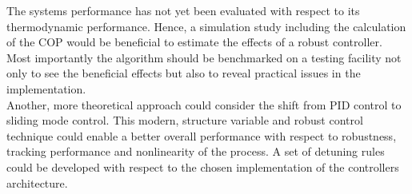 The systems performance has not yet been evaluated with respect to its thermodynamic performance. Hence, a simulation study including the calculation of the COP would be beneficial to estimate the effects of a robust controller.\\

Most importantly the algorithm should be benchmarked on a testing facility not only to see the beneficial effects but also to reveal practical issues in the implementation.\\

Another, more theoretical approach could consider the shift from PID control to sliding mode control. This modern, structure variable and robust control technique could enable a better overall performance with respect to robustness, tracking performance and nonlinearity of the process. A set of detuning rules could be developed with respect to the chosen implementation of the controllers architecture.
